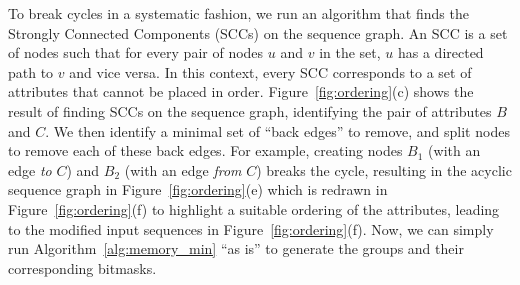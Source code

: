 To break cycles in a systematic fashion, we run an algorithm that finds the Strongly Connected Components (SCCs) on the sequence graph.  An SCC is a set of nodes such that for every pair of nodes $u$ and $v$ in the set, $u$ has a directed path to $v$ and vice versa. In this context, every SCC corresponds to a set of attributes that cannot be placed in order.  Figure~\ref{fig:ordering}(c) shows the result of finding SCCs on the sequence graph, identifying the pair of attributes $B$ and $C$. We then identify a minimal set of ``back edges'' to remove, and split nodes to remove each of these back edges.  For example, creating nodes $B_1$ (with an edge \emph{to} $C$) and $B_2$ (with an edge \emph{from} $C$) breaks the cycle, resulting in the acyclic sequence graph in Figure~\ref{fig:ordering}(e) which is redrawn in Figure~\ref{fig:ordering}(f) to highlight a suitable ordering of the attributes, leading to the modified input sequences in Figure~\ref{fig:ordering}(f).  Now, we can simply run Algorithm~\ref{alg:memory_min} ``as is'' to generate the groups and their corresponding bitmasks.

%




